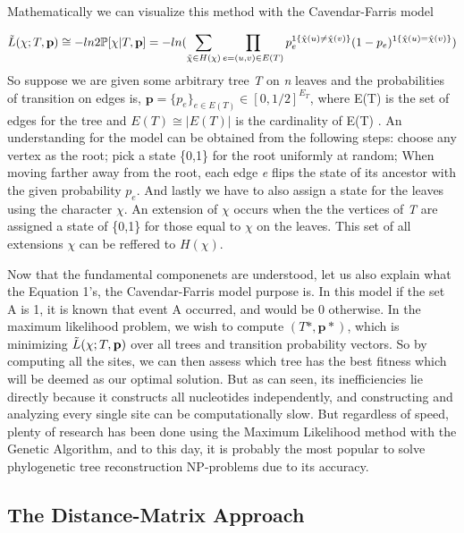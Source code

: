 Mathematically we can visualize this method with the Cavendar-Farris model \cite{Roch}

\begin{equation}
\label{Cavendar-Farris}
\tilde{\mathnormal{L}}(\chi;\mathnormal{T},\textbf{p})\cong -ln2\mathbb{P}[\chi|\mathnormal{T}, \textbf{p}] = -ln(\sum \limits_{\tilde{\chi}\in H(\chi)} \prod\limits_{e=(u,v)\in E(T)} p_e^{1\{\hat{\chi}(u)\neq\hat{\chi}(v)\}} (1-p_e)^{1\{\hat{\chi}(u)=\hat{\chi}(v)\}}) 
\end{equation}
So suppose we are given some arbitrary tree \emph{T} on \emph{n} leaves and the probabilities of transition on edges is, $\textbf{p} = \{ p_e \}_{e \in E(T)} \in [0,1/2]^{E_T}$, where E(T) is the set of edges for the tree and $E(T) \cong |E(T)|$ is the cardinality of E(T) \cite{Roch}. An understanding for the model can be obtained from the following steps: choose any vertex as the root; pick a state \{0,1\} for the root uniformly at random; When moving farther away from the root, each edge \emph{e} flips the state of its ancestor with the given probability $p_e$. And lastly we have to also assign a state for the leaves using the character $\chi$. An extension of $\chi$ occurs when the the vertices of \emph{T} are assigned a state of \{0,1\} for those equal to $\chi$ on the leaves. This set of all extensions $\chi$ can be reffered to $H(\chi)$.

Now that the fundamental componenets are understood, let us also explain what the Equation 1's, the Cavendar-Farris model purpose is. In this model if the set {A} is 1, it is known that event A occurred, and would be 0 otherwise. In the maximum likelihood problem, we wish to compute $(T*,\textbf{p}*)$, which is minimizing $\tilde{\mathnormal{L}}(\chi;T,\textbf{p})$ over all trees and transition probability vectors. So by computing all the sites, we can then assess which tree has the best fitness which will be deemed as our optimal solution. But as can seen, its inefficiencies lie directly because it constructs all nucleotides independently, and constructing and analyzing every single site can be computationally slow. But regardless of speed, plenty of research has been done using the Maximum Likelihood method with the Genetic Algorithm, and to this day, it is probably the most popular to solve phylogenetic tree reconstruction NP-problems due to its accuracy.  

\subsection{The Distance-Matrix Approach}

